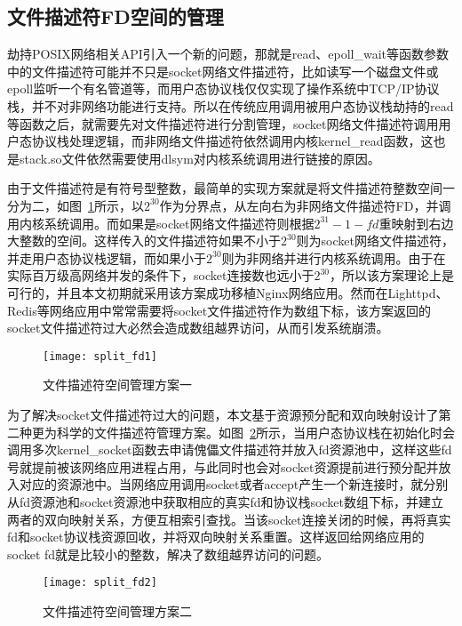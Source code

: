 \subsection{文件描述符FD空间的管理}

劫持POSIX网络相关API引入一个新的问题，那就是read、epoll\_wait等函数参数中的文件描述符可能并不只是socket网络文件描述符，比如读写一个磁盘文件或epoll监听一个有名管道等，而用户态协议栈仅仅实现了操作系统中TCP/IP协议栈，并不对非网络功能进行支持。所以在传统应用调用被用户态协议栈劫持的read等函数之后，就需要先对文件描述符进行分割管理，socket网络文件描述符调用用户态协议栈处理逻辑，而非网络文件描述符依然调用内核kernel\_read函数，这也是stack.so文件依然需要使用dlsym对内核系统调用进行链接的原因。

由于文件描述符是有符号型整数，最简单的实现方案就是将文件描述符整数空间一分为二，如图~\ref{fig:split_fd1}所示，以$2^{30}$作为分界点，从左向右为非网络文件描述符FD，并调用内核系统调用。而如果是socket网络文件描述符则根据$2^{31}-1 - fd$重映射到右边大整数的空间。这样传入的文件描述符如果不小于$2^{30}$则为socket网络文件描述符，并走用户态协议栈逻辑，而如果小于$2^{30}$则为非网络并进行内核系统调用。由于在实际百万级高网络并发的条件下，socket连接数也远小于$2^{30}$，所以该方案理论上是可行的，并且本文初期就采用该方案成功移植Nginx网络应用。然而在Lighttpd、Redis等网络应用中常常需要将socket文件描述符作为数组下标，该方案返回的socket文件描述符过大必然会造成数组越界访问，从而引发系统崩溃。

\vspace{-10pt}
\begin{figure}[H] %
  \centering
  \texttt{[image: split\_fd1]}
  \caption{文件描述符空间管理方案一}
  \label{fig:split_fd1}
\end{figure}
\vspace{-10pt}

为了解决socket文件描述符过大的问题，本文基于资源预分配和双向映射设计了第二种更为科学的文件描述符管理方案。如图~\ref{fig:split_fd2}所示，当用户态协议栈在初始化时会调用多次kernel\_socket函数去申请傀儡文件描述符并放入fd资源池中，这样这些fd号就提前被该网络应用进程占用，与此同时也会对socket资源提前进行预分配并放入对应的资源池中。当网络应用调用socket或者accept产生一个新连接时，就分别从fd资源池和socket资源池中获取相应的真实fd和协议栈socket数组下标，并建立两者的双向映射关系，方便互相索引查找。当该socket连接关闭的时候，再将真实fd和socket协议栈资源回收，并将双向映射关系重置。这样返回给网络应用的socket fd就是比较小的整数，解决了数组越界访问的问题。
\vspace{-10pt}
\begin{figure}[H] %
  \centering
  \texttt{[image: split\_fd2]}
  \caption{文件描述符空间管理方案二}
  \label{fig:split_fd2}
\end{figure}
\vspace{-10pt}

